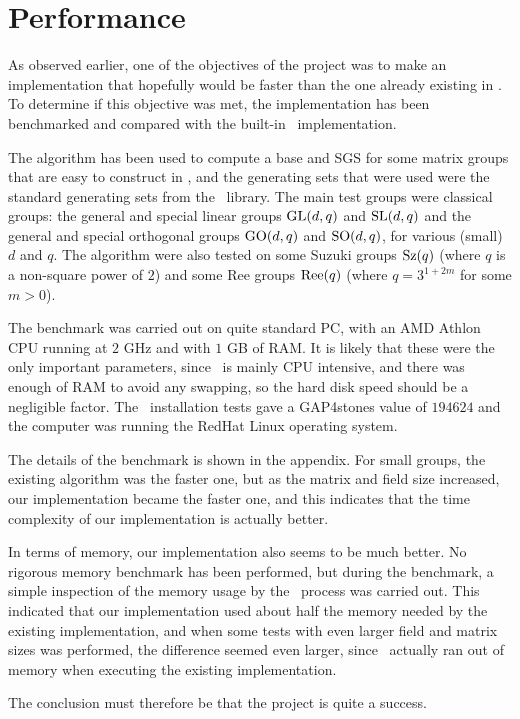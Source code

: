 \chapter{Performance}

As observed earlier, one of the objectives of the project was to make
an implementation that hopefully would be faster than the one already
existing in \GAP. To determine if this objective was met, the
implementation has been benchmarked and compared with the built-in
\GAP~implementation.

The algorithm has been used to compute a base and SGS for some matrix
groups that are easy to construct in \GAP, and the generating sets
that were used were the standard generating sets from the
\GAP~library. The main test groups were classical groups: the general
and special linear groups $\operatorname{GL}(d, q)$ and $\operatorname{SL}(d, q)$ and the general
and special orthogonal groups $\operatorname{GO}(d, q)$ and $\operatorname{SO}(d, q)$, for various
(small) $d$ and $q$. The algorithm were also tested on some Suzuki
groups $\operatorname{Sz}(q)$ (where $q$ is a non-square power of $2$) and some Ree
groups $\operatorname{Ree}(q)$ (where $q = 3^{1 + 2m}$ for some $m > 0$).

The benchmark was carried out on quite standard PC, with an AMD Athlon
CPU running at $2$ GHz and with $1$ GB of RAM. It is likely
that these were the only important parameters, since \GAP~is mainly
CPU intensive, and there was enough of RAM to avoid any
swapping, so the hard disk speed should be a negligible factor. The
\GAP~installation tests gave a GAP4stones value of $194624$ and the computer
was running the RedHat Linux operating system. 

The details of the benchmark is shown in the appendix. For small groups, the existing algorithm was the faster one, but as the matrix and field size increased, our implementation became the faster one, and this indicates that the time complexity of our implementation is actually better. 

In terms of memory, our implementation also seems to be much better.
No rigorous memory benchmark has been performed, but during the
benchmark, a simple inspection of the memory usage by the \GAP~process
was carried out. This indicated that our implementation used about half the memory needed by the existing implementation, and when some tests with even larger field and matrix sizes was performed, the difference seemed even larger, since \GAP~actually ran out of memory when executing the existing implementation.

The conclusion must therefore be that the project is quite a success.
